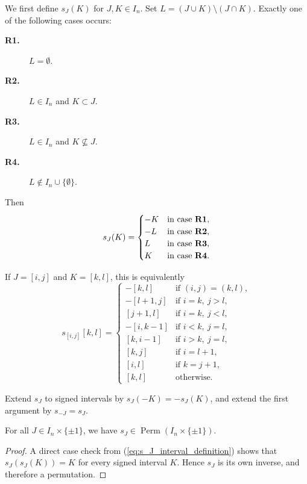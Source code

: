 We first define $s_J(K)$ for $J,K\in I_n$. Set
$L=(J\cup K)\setminus(J\cap K)$. Exactly one of the following cases occurs:
\begin{description}
    \item[{\bf R1.}] $L=\emptyset$.
    \item[{\bf R2.}] $L\in I_n$ and $K\subset J$.
    \item[{\bf R3.}] $L\in I_n$ and $K\not\subseteq J$.
    \item[{\bf R4.}] $L\notin I_n\cup\{\emptyset\}$.
\end{description}
Then
\begin{equation}\label{eq:s_J_definition}
s_J(K)=
\begin{cases}
    -K & \text{in case }{\bf R1},\\
    -L & \text{in case }{\bf R2},\\
    L & \text{in case }{\bf R3},\\
    K & \text{in case }{\bf R4}.
\end{cases}
\end{equation}

If $J=[i,j]$ and $K=[k,l]$, this is equivalently
\begin{equation}\label{eq:s_J_interval_definition}
s_{[i,j]}[k,l]=
\begin{cases}
    -[k,l] & \text{if }(i,j)=(k,l),\\
    {-[l+1,j]} & \text{if }i=k,\ j>l,\\
    {[j+1,l]} & \text{if }i=k,\ j<l,\\
    {-[i,k-1]} & \text{if }i<k,\ j=l,\\
    {[k,i-1]} & \text{if }i>k,\ j=l,\\
    {[k,j]} & \text{if }i=l+1,\\
    {[i,l]} & \text{if }k=j+1,\\
    {[k,l]} & \text{otherwise.}
\end{cases}
\end{equation}

Extend $s_J$ to signed intervals by $s_J(-K)=-s_J(K)$, and extend the
first argument by $s_{-J}=s_J$.

\begin{lemma}\label{lemma:s_J_are_permutations}
\leanok
For all $J\in I_n\times\{\pm1\}$, we have
$s_J\in\operatorname{Perm}(I_n\times\{\pm1\})$.
\end{lemma}
\begin{proof}
    \leanok
A direct case check from (\ref{eq:s_J_interval_definition}) shows that
$s_J(s_J(K))=K$ for every signed interval $K$. Hence $s_J$ is its own
inverse, and therefore a permutation.
\end{proof}

